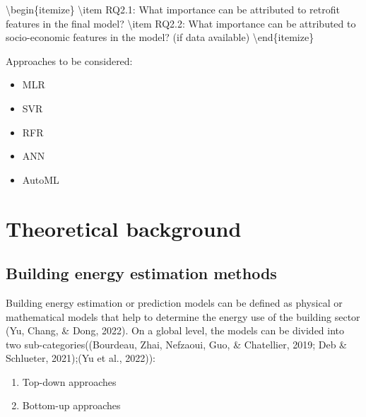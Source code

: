 \documentclass[
  letterpaper,
  DIV=11,
  numbers=noendperiod]{scrreprt}
\newenvironment{Shaded}{\begin{snugshade}}{\end{snugshade}}
\newcommand{\ExtensionTok}[1]{\textcolor[rgb]{0.00,0.23,0.31}{#1}}
\newcommand{\FunctionTok}[1]{\textcolor[rgb]{0.28,0.35,0.67}{#1}}
\newcommand{\KeywordTok}[1]{\textcolor[rgb]{0.00,0.23,0.31}{#1}}
\newcommand{\NormalTok}[1]{\textcolor[rgb]{0.00,0.23,0.31}{#1}}
\providecommand{\tightlist}{%
  \setlength{\itemsep}{0pt}\setlength{\parskip}{0pt}}\usepackage{longtable,booktabs,array}
\begin{document}
\begin{Shaded}
\begin{Highlighting}[]
\KeywordTok{\textbackslash{}begin}\NormalTok{\{}\ExtensionTok{itemize}\NormalTok{\}}
    \FunctionTok{\textbackslash{}item}\NormalTok{ RQ2.1: What importance can be attributed to retrofit features in the final model?}
    \FunctionTok{\textbackslash{}item}\NormalTok{ RQ2.2: What importance can be attributed to socio{-}economic features in the model? (if data available)}
\KeywordTok{\textbackslash{}end}\NormalTok{\{}\ExtensionTok{itemize}\NormalTok{\}}
\end{Highlighting}
\end{Shaded}

Approaches to be considered:

\begin{itemize}
\item
  MLR
\item
  SVR
\item
  RFR
\item
  ANN
\item
  AutoML
\end{itemize}


\hypertarget{theoretical-background}{%
\chapter{Theoretical background}\label{theoretical-background}}

\hypertarget{energy-estimation-methods}{%
\section{Building energy estimation
methods}\label{energy-estimation-methods}}

Building energy estimation or prediction models can be defined as
physical or mathematical models that help to determine the energy use of
the building sector (Yu, Chang, \& Dong, 2022). On a global level, the
models can be divided into two sub-categories((Bourdeau, Zhai, Nefzaoui,
Guo, \& Chatellier, 2019; Deb \& Schlueter, 2021);(Yu et al., 2022)):

\begin{enumerate}
\def\labelenumi{\arabic{enumi}.}
\tightlist
\item
  Top-down approaches
\item
  Bottom-up approaches
\end{enumerate}
\end{document}
